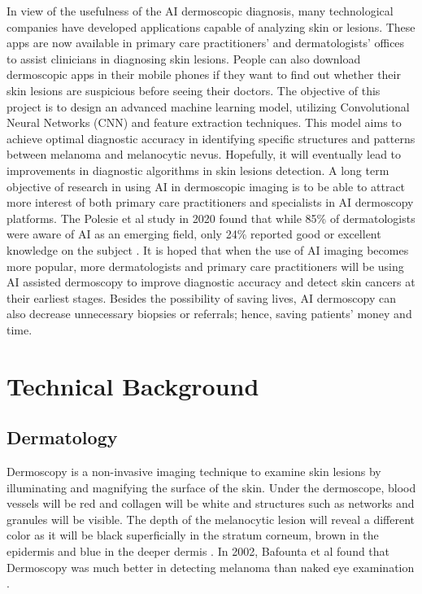 \documentclass[10pt,twocolumn]{article}
\begin{document}
\newline
\newline
In view of the usefulness of the AI dermoscopic diagnosis, many technological companies have developed applications capable of analyzing skin or lesions. These apps are now available in primary care practitioners’ and dermatologists’ offices to assist clinicians in diagnosing skin lesions. People can also download dermoscopic apps in their mobile phones if they want to find out whether their skin lesions are suspicious before seeing their doctors. 
\newline
\newline
The objective of this project is to design an advanced machine learning model, utilizing Convolutional Neural Networks (CNN) and feature extraction techniques. This model aims to achieve optimal diagnostic accuracy in identifying specific structures and patterns between melanoma and melanocytic nevus. Hopefully, it will eventually lead to improvements in diagnostic algorithms in skin lesions detection.
\newline
\newline
A long term objective of research in using AI in dermoscopic imaging is to be able to attract more interest of both primary care practitioners and specialists in AI dermoscopy platforms. The Polesie et al study in 2020 found that while 85\% of dermatologists were aware of AI as an emerging field, only 24\% reported good or excellent knowledge on the subject \cite{stiff2022artificial}. It is hoped that when the use of AI imaging becomes more popular, more dermatologists and primary care practitioners will be using AI assisted dermoscopy to improve diagnostic accuracy and detect skin cancers at their earliest stages. Besides the possibility of saving lives, AI dermoscopy can also decrease unnecessary biopsies or referrals; hence, saving patients’ money and time. 
\newline
\section{Technical Background}
\subsection{Dermatology}
Dermoscopy is a non-invasive imaging technique to examine skin lesions by illuminating and magnifying the surface of the skin. Under the dermoscope, blood vessels will be red and collagen will be white and structures such as networks and granules will be visible. The depth of the melanocytic lesion will reveal a different color as it will be black superficially in the stratum corneum, brown in the epidermis and blue in the deeper dermis \cite{sonthalia2019dermoscopy}. In 2002, Bafounta et al found that Dermoscopy was much better in detecting melanoma than naked eye examination \cite{bafounta2001dermoscopy}.
\end{document}
